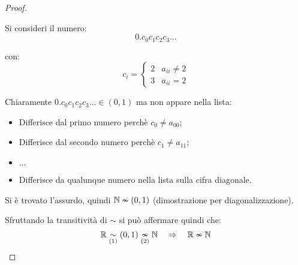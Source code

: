 \begin{proof}
\begin{enumerate}
\begin{minipage}{.48\textwidth}
                Si consideri il numero:
                $$ 0.c_0c_1c_2c_3\dots $$

                con: $$ c_i = \begin{cases}
                2 & a_{ii}\neq2\\
                3 & a_{ii}=2
                \end{cases} $$

            \end{minipage}
            Chiaramente $0.c_0c_1c_2c_3\dots\in(0,1)$ ma non appare nella lista:
            \begin{itemize}
                \item Differisce dal primo numero perchè $c_0\neq a_{00}$;
                \item Differisce dal secondo numero perchè $c_1\neq a_{11}$;
                \item $\dots$
                \item Differisce da qualunque numero nella lista sulla cifra 
                    {\color{red} diagonale}.
            \end{itemize}
            Si è trovato l'assurdo, quindi $\mathbb{N} \nsim (0,1)$ (dimostrazione per 
            diagonalizzazione).
    \end{enumerate}
    Sfruttando la transitività di $\sim$ si può affermare quindi che:
    $$ \mathbb{R} \underset{(1)}{\sim} (0,1) \underset{(2)}{\nsim} \mathbb{N} \quad \Rightarrow \quad \mathbb{R} \nsim \mathbb{N} $$
\end{proof}

